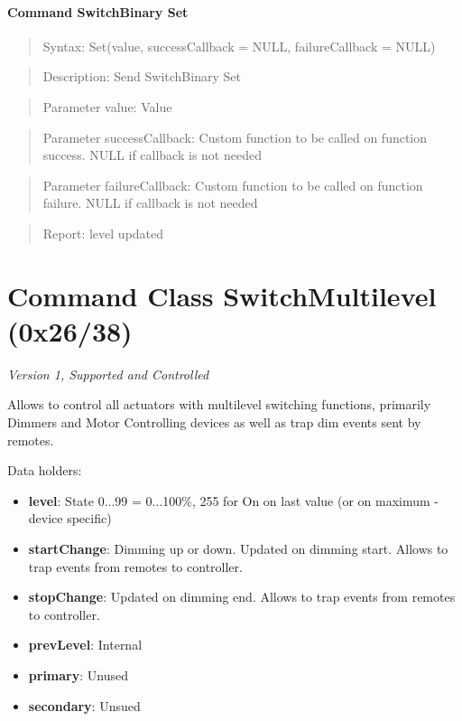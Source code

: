 \paragraph{Command SwitchBinary Set}
\begin{quote}Syntax: Set(value, successCallback = NULL, failureCallback = NULL)\end{quote}
\begin{quote}Description: Send SwitchBinary Set\end{quote}
\begin{quote}Parameter value: Value\end{quote}
\begin{quote}Parameter successCallback: Custom function to be called on function success. NULL if callback is not needed\end{quote}
\begin{quote}Parameter failureCallback: Custom function to be called on function failure. NULL if callback is not needed\end{quote}
\begin{quote}Report: level updated\end{quote}


\section{Command Class SwitchMultilevel (0x26/38)}

\textit{Version 1, Supported and Controlled}
\newline

Allows to control all actuators with multilevel switching functions, primarily Dimmers and Motor Controlling devices as well as trap dim events sent by remotes.
\newline

\noindent
Data holders:

\begin{itemize}
\item \textbf{level}: State 0...99 = 0...100\%, 255 for On on last value (or on maximum - device specific)
\item \textbf{startChange}: Dimming up or down. Updated on dimming start. Allows to trap events from remotes to controller.
\item \textbf{stopChange}: Updated on dimming end. Allows to trap events from remotes to controller.
\item \textbf{prevLevel}: Internal
\item \textbf{primary}: Unused
\item \textbf{secondary}: Unsued
\end{itemize}

